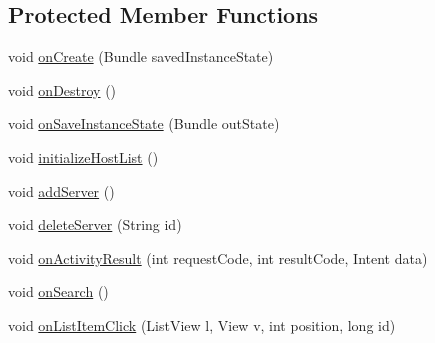 \subsection*{Protected Member Functions}
\begin{DoxyCompactItemize}
\item 
void \hyperlink{classcom_1_1zia_1_1freshdocs_1_1activity_1_1_hosts_activity_a5afd68e90cae01b1ea871772601a5318}{on\-Create} (Bundle saved\-Instance\-State)
\item 
void \hyperlink{classcom_1_1zia_1_1freshdocs_1_1activity_1_1_hosts_activity_ac4d9af8803806b1ccc60e3c465ab087b}{on\-Destroy} ()
\item 
void \hyperlink{classcom_1_1zia_1_1freshdocs_1_1activity_1_1_hosts_activity_a1698b09dd97e8ac806048a9a409e05ab}{on\-Save\-Instance\-State} (Bundle out\-State)
\item 
void \hyperlink{classcom_1_1zia_1_1freshdocs_1_1activity_1_1_hosts_activity_a859e8914d2251a9570019369dd29d414}{initialize\-Host\-List} ()
\item 
void \hyperlink{classcom_1_1zia_1_1freshdocs_1_1activity_1_1_hosts_activity_a64b08b36b8671409af81b00016bf7d8c}{add\-Server} ()
\item 
void \hyperlink{classcom_1_1zia_1_1freshdocs_1_1activity_1_1_hosts_activity_aceaedf6ef932842f90fde131a958d030}{delete\-Server} (String id)
\item 
void \hyperlink{classcom_1_1zia_1_1freshdocs_1_1activity_1_1_hosts_activity_a3e29da152e0a98f9b1d9248a41ec29ef}{on\-Activity\-Result} (int request\-Code, int result\-Code, Intent data)
\item 
void \hyperlink{classcom_1_1zia_1_1freshdocs_1_1activity_1_1_hosts_activity_af18541c4250a16511cc3af7e2e7a6fbb}{on\-Search} ()
\item 
void \hyperlink{classcom_1_1zia_1_1freshdocs_1_1activity_1_1_hosts_activity_a700a6d9c23fec8a69108d5e0781cb8a6}{on\-List\-Item\-Click} (List\-View l, View v, int position, long id)
\end{DoxyCompactItemize}


